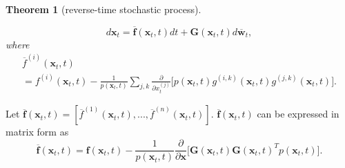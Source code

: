 \documentclass[10pt]{article}
\newtheorem{Twierdzenie}{Theorem}[section]
\begin{document}
\begin{Twierdzenie}[reverse-time stochastic process]
\begin{enumerate}
    \begin{equation}
        d \textbf{x}_t = \overline{\textbf{f}} (\textbf{x}_t , t) dt + \textbf{G} (\textbf{x}_t , t)
        d \overline{\textbf{w}} _t,
    \end{equation}
    where 
    \begin{equation}
    \begin{gathered}
        \overline{f}^{(i)}(\textbf{x}_t , t) \\
        =  f^{(i)}(\textbf{x}_t , t) - \frac{1}{p(\textbf{x}_t , t)} 
        \sum_{j, k} \frac{\partial}{\partial x_t^{(j)}} \Big[p(\textbf{x}_t , t)
        g^{(i,k)}(\textbf{x}_t , t)  g^{(j,k)}(\textbf{x}_t , t) \Big].
    \end{gathered}
    \end{equation}
\end{enumerate}
\end{Twierdzenie}
Let $ \overline{\textbf{f}}(\textbf{x}_t , t) = [ \overline{f}^{(1)}(\textbf{x}_t , t), ... ,  \overline{f}^{(n)}(\textbf{x}_t , t)]$. $ \overline{\textbf{f}}(\textbf{x}_t , t)$ can be expressed in matrix form as
\begin{equation}
\label{eq:f_hat}
 \overline{\textbf{f}}(\textbf{x}_t , t) =
    \textbf{f}(\textbf{x}_t , t) - \frac{1}{p(\textbf{x}_t , t)}\frac{\partial}{\partial \textbf{x}} \Big[ \textbf{G}(\textbf{x}_t, t) \textbf{G}(\textbf{x}_t, t) ^T p(\textbf{x}_t , t) \Big].
\end{equation}
\end{document}
